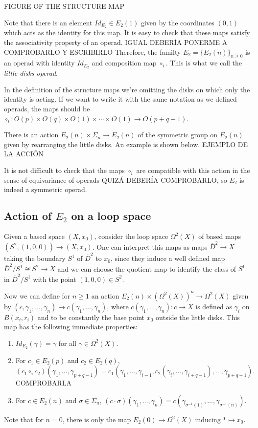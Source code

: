 \documentclass[TFM.tex]{subfiles}
\begin{document}
 FIGURE OF THE STRUCTURE MAP


Note that there is an element $Id_{E_2}\in E_2(1)$ given by the coordinates $(0,1)$ which acts as the identity for this map. It is easy to check that these maps satisfy the associativity property of an operad. IGUAL DEBERÍA PONERME A COMPROBARLO Y ESCRIBIRLO Therefore, the familty $E_2=\{E_2(n)\}_{n\geq 0}$ is an operad with identity $Id_{E_2}$ and composition map $\circ_i$. This is what we call the \emph{little disks operad}.

\begin{remark}
In the definition of the structure maps we're omitting the disks on which only the identity is acting. If we want to write it with the same notation as we defined operads, the maps should be $\circ_i:O(p)\times O(q)\times O(1)\times\cdots \times O(1)\to O(p+q-1)$. 
\end{remark}

There is an action $E_2(n)\times \Sigma_n\to E_2(n)$ of the symmetric group on $E_2(n)$ given by rearranging the little disks. An example is shown below.
EJEMPLO DE LA ACCIÓN

It is not difficult to check that the maps $\circ_i$ are compatible with this action in the sense of equivariance of operads QUIZÁ DEBERÍA COMPROBARLO, so $E_2$ is indeed a symmetric operad. 

\subsection{Action of $E_2$ on a loop space}
Given a based space $(X,x_0)$, consider the loop space $\Omega^2(X)$ of based maps $(S^2, (1,0,0))\to (X, x_0)$. One can interpret this maps as maps $\overline{D}^2\to X$ taking the boundary $S^1$ of $\overline{D}^2$ to $x_0$, since they induce a well defined map $\overline{D}^2/S^1\cong S^2\to X$ and we can choose the quotient map to identify the class of $S^1$ in $\overline{D}^2/S^1$ with the point $(1,0,0)\in S^2$. 

Now we can define for $n\geq 1$ an action $E_2(n)\times (\Omega^2(X))^n\to \Omega^2(X)$ given by $(c,\gamma_1,\dots, \gamma_n)\mapsto c(\gamma_1,\dots, \gamma_n)$, where 
$c(\gamma_1,\dots, \gamma_n):c\to X$ is defined as $\gamma_i$ on $B(x_i,r_i)$ and to be constantly the base point $x_0$ outside the little disks. This map has the following immediate properties:
\begin{enumerate}
\item $Id_{E_2}(\gamma)=\gamma$ for all $\gamma\in \Omega^2(X)$.
\item For $c_1\in E_2(p)$ and $c_2\in E_2(q)$, 
$$(c_1\circ_i c_2)(\gamma_1,\dots, \gamma_{p+q-1})=c_1(\gamma_1,\dots, \gamma_{i-1}, c_2(\gamma_i,\dots, \gamma_{i+q-1}),\dots, \gamma_{p+q-1}).$$ COMPROBARLA
\item For $c\in E_2(n)$ and $\sigma\in\Sigma_n$, $(c\cdot \sigma)(\gamma_1,\dots,\gamma_n)=c(\gamma_{\sigma^{-1}(1)},\dots, \gamma_{\sigma^{-1}(n)})$. 
\end{enumerate}
Note that for $n=0$, there is only the map $E_2(0)\to\Omega^2(X)$ inducing $*\mapsto x_0$. 
\end{document}
